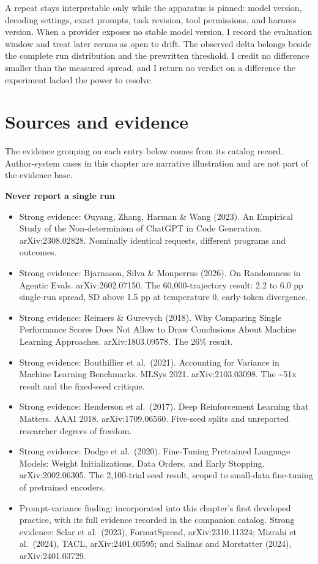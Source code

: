 A repeat stays interpretable only while the apparatus is pinned: model version, decoding settings, exact prompts, task revision, tool permissions, and harness version. When a provider exposes no stable model version, I record the evaluation window and treat later reruns as open to drift. The observed delta belongs beside the complete run distribution and the prewritten threshold. I credit no difference smaller than the measured spread, and I return no verdict on a difference the experiment lacked the power to resolve.

\section*{Sources and evidence}

The evidence grouping on each entry below comes from its catalog record. Author-system cases in this chapter are narrative illustration and are not part of the evidence base.

\textbf{Never report a single run}

\begin{itemize}
\tightlist
\item
  Strong evidence: Ouyang, Zhang, Harman \& Wang (2023). An Empirical Study of the Non-determinism of ChatGPT in Code Generation. arXiv:2308.02828. Nominally identical requests, different programs and outcomes.
\item
  Strong evidence: Bjarnason, Silva \& Monperrus (2026). On Randomness in Agentic Evals. arXiv:2602.07150. The 60,000-trajectory result: 2.2 to 6.0 pp single-run spread, SD above 1.5 pp at temperature 0, early-token divergence.
\item
  Strong evidence: Reimers \& Gurevych (2018). Why Comparing Single Performance Scores Does Not Allow to Draw Conclusions About Machine Learning Approaches. arXiv:1803.09578. The 26\% result.
\item
  Strong evidence: Bouthillier et al.~(2021). Accounting for Variance in Machine Learning Benchmarks. MLSys 2021. arXiv:2103.03098. The \textasciitilde51x result and the fixed-seed critique.
\item
  Strong evidence: Henderson et al.~(2017). Deep Reinforcement Learning that Matters. AAAI 2018. arXiv:1709.06560. Five-seed splits and unreported researcher degrees of freedom.
\item
  Strong evidence: Dodge et al.~(2020). Fine-Tuning Pretrained Language Models: Weight Initializations, Data Orders, and Early Stopping. arXiv:2002.06305. The 2,100-trial seed result, scoped to small-data fine-tuning of pretrained encoders.
\item
  Prompt-variance finding: incorporated into this chapter's first developed practice, with its full evidence recorded in the companion catalog. Strong evidence: Sclar et al.~(2023), FormatSpread, arXiv:2310.11324; Mizrahi et al.~(2024), TACL, arXiv:2401.00595; and Salinas and Morstatter (2024), arXiv:2401.03729.
\end{itemize}

